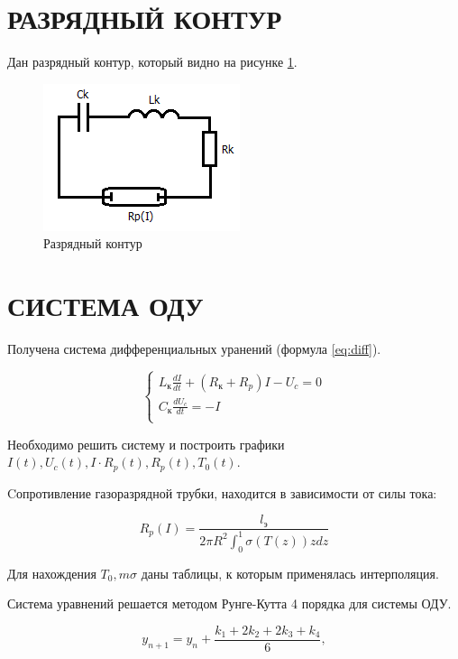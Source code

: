 \section{РАЗРЯДНЫЙ КОНТУР}

Дан разрядный контур, который видно на рисунке \ref{img:con}.

\begin{figure}[H]
    \centering
    \includegraphics[scale=1]{img/scheme.png}
    \caption{Разрядный контур}
    \label{img:con}
\end{figure}

\section{СИСТЕМА ОДУ}

Получена система дифференциальных уранений (формула \ref{eq:diff}).

\begin{equation}\label{eq:diff}
    \begin{cases}
        L_\text{к}\frac{dI}{dt} + (R_\text{к} + R_p) I - U_c = 0 \\
        C_\text{к} \frac{dU_c}{dt} = -I \\
    \end{cases}
\end{equation}

Необходимо решить систему и построить графики $I(t), U_c(t), I\cdot R_p(t), R_p(t), T_0(t)$.

Cопротивление газоразрядной трубки, находится в зависимости от силы тока:

\begin{equation}
    R_p(I) = \frac{l_{\text{э}}}{2 \pi R^2 \int_0^1 \sigma(T(z))zdz}
\end{equation}

Для нахождения $T_0, m \sigma$ даны таблицы, к которым применялась интерполяция.

Система уравнений решается методом Рунге-Кутта 4 порядка для системы ОДУ.

\begin{equation*}
    y_{n+1} = y_n + \frac{k_1 + 2k_2 + 2k_3 + k_4}{6},
\end{equation*}

